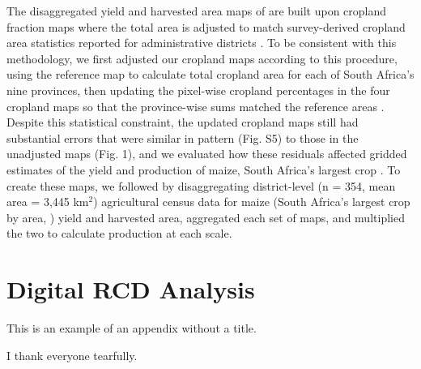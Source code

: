 \documentclass{pnastwo}
\begin{document}
\begin{article}
\begin{materials}
The disaggregated yield and harvested area maps of \cite{monfreda_farming_2008} are built upon cropland fraction maps where the total area is adjusted to match survey-derived cropland area statistics reported for administrative districts \cite[provinces, in South Africa's case][]{ramankutty_farming_2008}. To be consistent with this methodology, we first adjusted our cropland maps according to this procedure, using the reference map to calculate total cropland area for each of South Africa's nine provinces, then updating the pixel-wise cropland percentages in the four cropland maps so that the province-wise sums matched the reference areas \cite[][and see SI]{ramankutty_farming_2008}. Despite this statistical constraint, the updated cropland maps still had substantial errors that were similar in pattern (Fig. S5) to those in the unadjusted maps (Fig. 1), and we evaluated how these residuals affected gridded estimates of the yield and production of maize, South Africa's largest crop \cite{estes_comparing_2013}. To create these maps, we followed \cite{monfreda_farming_2008} by disaggregating district-level (n = 354, mean area = 3,445 km$^2$) agricultural census data \cite{statistics_south_africa_commercial_2007} for maize (South Africa's largest crop by area, \cite{estes_comparing_2013}) yield and harvested area, aggregated each set of maps, and multiplied the two to calculate production at each scale. 

\section{Digital RCD Analysis} 
\end{materials}

\appendix[App 1]

\appendix
This is an example of an appendix without a title.

\begin{acknowledgments}
I thank everyone tearfully. 
\end{acknowledgments}


 
{\footnotesize }

%


\end{article}
\end{document}
